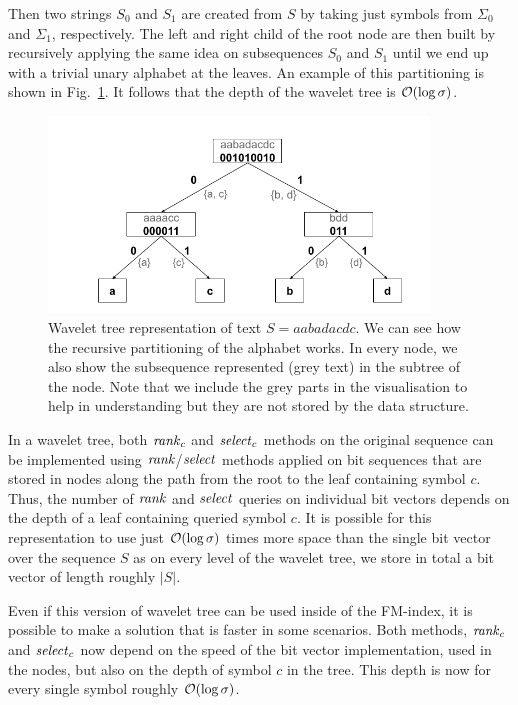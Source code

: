 Then two strings $S_0$ and $S_1$ are created from $S$ by taking just symbols
from $\Sigma_0$ and $\Sigma_1$, respectively. The left and right child of the root node
are then built by recursively applying the same idea on subsequences $S_0$ and $S_1$ until
we end up with a trivial unary alphabet at the leaves. An example of this partitioning is
shown in Fig.~\ref{obr:WaveletTreeExample}. It follows that the depth of the wavelet tree
is $\mathcal{O}(\log \sigma)$.
\begin{figure}
	\centerline{
		\includegraphics[width=0.9\textwidth, height=0.3\textheight]{images/wavelet_tree}
	}
	\caption[TODO]{Wavelet tree representation of text $S=\mathit{aabadacdc}$. We can see how
	the recursive partitioning of the alphabet works. In every node, we also show the
	subsequence represented (grey text) in the subtree of the node. Note that we include the
	grey parts in the visualisation to help in understanding but they are not stored by
	the data structure.
	}
	\label{obr:WaveletTreeExample}
\end{figure}

In a wavelet tree, both $\mathit{rank}_c$ and $\mathit{select}_c$ methods on the original sequence can
be implemented using $\mathit{rank}$/$\mathit{select}$ methods applied on bit sequences that are stored
in nodes along the path from the root to the leaf containing symbol $c$. Thus, the
number of $\mathit{rank}$ and $\mathit{select}$ queries on individual bit vectors depends on the depth of
a leaf containing queried symbol $c$. It is possible for this representation to use
just $\mathcal{O}(\log \sigma)$ times more space than the single bit vector over the sequence $S$
as on every level of the wavelet tree, we store in total a bit vector of length roughly $|S|$.

Even if this version of wavelet tree can be used inside of the FM-index, it is possible to
make a solution that is faster in some scenarios. Both methods, $\mathit{rank}_c$ and $\mathit{select}_c$ now
depend on the speed of the bit vector implementation, used in the nodes, but also on the depth
of symbol $c$ in the tree. This depth is now for every single symbol roughly $\mathcal{O}(\log \sigma)$.

